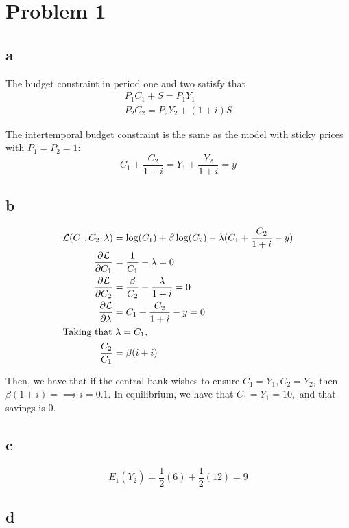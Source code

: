 \documentclass[12pt,letterpaper]{article}
\theoremstyle{definition}
\begin{document}
\section*{Problem 1}

\subsection*{a}

The budget constraint in period one and two satisfy that
\begin{gather*}
  P_1C_1 + S = P_1Y_1 \\
  P_2C_2 = P_2Y_2 + (1 + i)S
\end{gather*}

The intertemporal budget constraint is the same as the model with sticky prices with $P_1 =
P_2 = 1$:
\[
  C_1 + \frac{C_2}{1 + i} = Y_1 + \frac{Y_2}{1 + i} = y
\]

\subsection*{b}

\begin{align*}
  \mathcal{L}(C_1, C_2, \lambda) &= \log(C_1) + \beta \log(C_2) - \lambda(C_1 + \frac{C_2}{1+i} - y)\\
  \frac{\partial \mathcal{L}}{\partial C_1} &= \frac{1}{C_1} - \lambda = 0\\
  \frac{\partial \mathcal{L}}{\partial C_2} &= \frac{\beta}{C_2} - \frac{\lambda}{1+i} = 0 \\
  \frac{\partial \mathcal{L}}{\partial \lambda} &= C_1 + \frac{C_2}{1+i} - y = 0\\
  \intertext{Taking that $\lambda = C_1$, }
  \frac{C_2}{C_1} &= \beta(i + i) \\
\end{align*}

Then, we have that if the central bank wishes to ensure $C_1 = Y_1, C_2 = Y_2$,
then $\beta(1 + i) = \implies i = 0.1$. In equilibrium, we have that $C_1 = Y_1
= 10,$ and that savings is $0$.

\subsection*{c}

\[
  E_1(\overline{Y_2}) = \frac{1}{2}(6) + \frac{1}{2}(12) = 9
\]

\subsection*{d}
\end{document}
